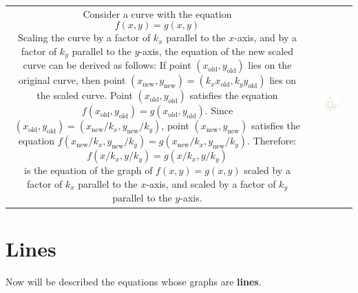 \documentclass{article}
\begin{document}
\begin{tabular}{cc}
\parbox{0.5\textwidth}{
Consider a curve with the equation 
\[f(x,y) = g(x,y)\] 
Scaling the curve by a factor of \(k_x\) parallel to the \(x\)-axis, and by a factor of \(k_y\) parallel to the \(y\)-axis, the equation of the new scaled curve can be derived as follows: If point \((x_\text{old}, y_\text{old})\) lies on the original curve, then point \((x_\text{new}, y_\text{new}) = (k_x x_\text{old}, k_y y_\text{old})\) lies on the scaled curve. Point \((x_\text{old}, y_\text{old})\) satisfies the equation \(f(x_\text{old},y_\text{old}) = g(x_\text{old},y_\text{old})\). Since \((x_\text{old}, y_\text{old}) = (x_\text{new}/k_x, y_\text{new}/k_y)\), point \((x_\text{new}, y_\text{new})\) satisfies the equation \(f(x_\text{new}/k_x, y_\text{new}/k_y) = g(x_\text{new}/k_x, y_\text{new}/k_y)\). Therefore:
\[f(x/k_x, y/k_y) = g(x/k_x, y/k_y)\] 
is the equation of the graph of \(f(x,y) = g(x,y)\) scaled by a factor of \(k_x\) parallel to the \(x\)-axis, and scaled by a factor of \(k_y\) parallel to the \(y\)-axis.
} & \parbox{0.5\textwidth}{
\includegraphics[width = 0.5\textwidth]{lateral_scaling_of_curves}
}
\end{tabular}




\section*{Lines}

Now will be described the equations whose graphs are {\bf lines}.
\end{document}
